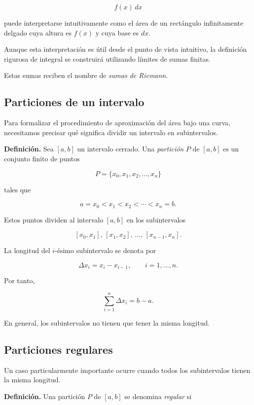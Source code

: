 \documentclass[12pt]{article}
\begin{document}
\[
f(x)\,dx
\]

puede interpretarse intuitivamente como el área de un rectángulo
infinitamente delgado cuya altura es $f(x)$ y cuya base es $dx$.

Aunque esta interpretación es útil desde el punto de vista intuitivo,
la definición rigurosa de integral se construirá utilizando límites
de sumas finitas.

Estas sumas reciben el nombre de \emph{sumas de Riemann}.

\subsection{Particiones de un intervalo}

Para formalizar el procedimiento de aproximación del área bajo una curva,
necesitamos precisar qué significa dividir un intervalo en subintervalos.

\textbf{Definición.}
Sea $[a,b]$ un intervalo cerrado. Una \emph{partición} $P$ de $[a,b]$
es un conjunto finito de puntos

\[
P=\{x_0,x_1,x_2,\ldots,x_n\}
\]

tales que

\[
a=x_0<x_1<x_2<\cdots<x_n=b.
\]

Estos puntos dividen al intervalo $[a,b]$ en los subintervalos

\[
[x_0,x_1],\,
[x_1,x_2],\,
\ldots,\,
[x_{n-1},x_n].
\]

La longitud del $i$-ésimo subintervalo se denota por

\[
\Delta x_i=x_i-x_{i-1},
\qquad i=1,\ldots,n.
\]

Por tanto,

\[
\sum_{i=1}^{n}\Delta x_i=b-a.
\]

En general, los subintervalos no tienen que tener la misma longitud.

\subsection{Particiones regulares}

Un caso particularmente importante ocurre cuando todos los subintervalos
tienen la misma longitud.

\textbf{Definición.}
Una partición $P$ de $[a,b]$ se denomina \emph{regular} si
\end{document}
